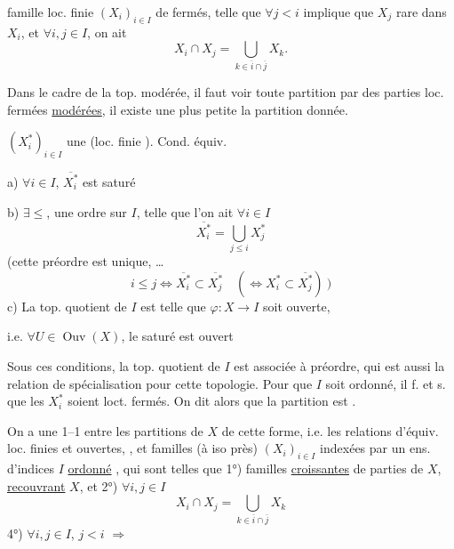 famille loc. finie  $(X_i)_{i\in I}$ de fermés, telle que $\forall j<i$
implique que $X_j$ rare dans $X_i$, et $\forall i,j\in I$,
on ait
\[
X_i\cap X_j=\bigcup_{k\in\overline i\cap\overline j}X_k.
\]

Dans le cadre de la top. modérée, il faut voir 
 toute partition par des parties loc. fermées \uline{modérées},
il existe une plus petite 
  
 la partition donnée.


$(X_i^*)_{i\in I}$ une   
(loc. finie ). Cond. équiv.

a) $\forall i\in I$, 
$\overline{X_i^*}$ est saturé 

b) $\exists\leq$, une  ordre sur $I$, telle que l'on ait $\forall i\in I$
\[
\overline{X_i^*}=\bigcup_{j\leq i}X_j^*
\]
(cette  préordre est unique, \ldots
\[
i\leq j\Longleftrightarrow\overline{X_i^*}\subset\overline{X_j^*}
\quad(\Longleftrightarrow X_i^*\subset\overline{X_j^*})\ )
\]
c) La top. quotient de $I$ est telle que $\varphi:X\longrightarrow I$ soit ouverte,

i.e. $\forall U\in\operatorname{Ouv}(X)$, le saturé est ouvert

Sous ces conditions, la top. quotient de $I$ est 
associée à  préordre, qui est aussi
la relation de spécialisation pour cette topologie.
Pour que $I$ soit ordonné, il f. et s. que les
$X_i^*$ soient loct. fermés. On dit alors que la partition est
 .

On a une  1--1 entre les partitions
 de $X$ de cette forme, i.e. les relations d'équiv. loc.
finies et ouvertes, , et  familles (à iso près)
$(X_i)_{i\in I}$ indexées par un ens. d'indices $I$ \uline{ordonné}
,
qui sont telles que 1°) familles \uline{croissantes} de parties
  de $X$, \uline{recouvrant} $X$, et 2°) $\forall i,j\in I$
\[
X_i\cap X_j=\bigcup_{k\in\overline i\cap\overline j}X_k
\]
4°)  $\forall i,j\in I$, $j<i$
$\Longrightarrow$ 

